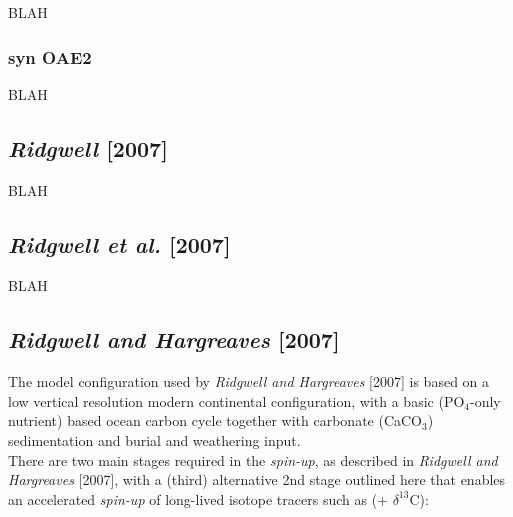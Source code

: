 \documentclass[10pt,twoside]{article}
\begin{document}
BLAH


\subsubsection{syn OAE2}\label{EXAMPLE.p0093k.Monteiroetal2012 OAE2.SPIN}

BLAH


\subsection{\textit{Ridgwell} [2007]}

BLAH


\subsection{\textit{Ridgwell et al.} [2007]}

BLAH


\subsection{\textit{Ridgwell and Hargreaves} [2007]}

The model configuration used by \textit{Ridgwell and Hargreaves} [2007] is based on a low vertical resolution modern continental configuration, with a basic (PO$_{4}$-only nutrient) based ocean carbon cycle together with carbonate (CaCO$_{3}$) sedimentation and burial and weathering input.
\\ There are two main stages required in the \textit{spin-up}, as described in \textit{Ridgwell and Hargreaves} [2007], with a (third) alternative 2nd stage outlined here that enables an accelerated \textit{spin-up} of long-lived isotope tracers such as (+ $\delta^{13}$C):
\end{document}
